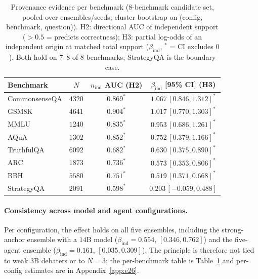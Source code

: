 \begin{table}[t]
\centering\small
\caption{Provenance evidence per benchmark ($8$-benchmark candidate set, pooled over ensembles/seeds; cluster
bootstrap on (config, benchmark, question)). H2: directional AUC of independent support ($>0.5$ = predicts
correctness); H3: partial log-odds of an independent origin at matched total support ($\beta_{\mathrm{ind}}$,
$^{*}$ = CI excludes $0$). Both hold on $7$--$8$ of $8$ benchmarks; StrategyQA is the boundary case.}
\label{tab:h3bench}
\begin{tabular}{lccc}
\toprule
Benchmark & $N$ & $n_{\mathrm{ind}}$ AUC (H2) & $\beta_{\mathrm{ind}}$ [95\% CI] (H3) \\
\midrule
CommonsenseQA & $4320$ & $0.869^{*}$ & $1.067\,[0.846,1.312]^{*}$ \\
GSM8K         & $4641$ & $0.904^{*}$ & $1.017\,[0.770,1.303]^{*}$ \\
MMLU          & $1240$ & $0.835^{*}$ & $0.953\,[0.686,1.261]^{*}$ \\
AQuA          & $1302$ & $0.852^{*}$ & $0.752\,[0.379,1.166]^{*}$ \\
TruthfulQA    & $6092$ & $0.682^{*}$ & $0.630\,[0.375,0.890]^{*}$ \\
ARC           & $1873$ & $0.736^{*}$ & $0.573\,[0.353,0.806]^{*}$ \\
BBH           & $5580$ & $0.751^{*}$ & $0.519\,[0.371,0.668]^{*}$ \\
StrategyQA    & $2091$ & $0.598^{*}$ & $0.203\,[-0.059,0.488]$ \\
\bottomrule
\end{tabular}
\end{table}

\paragraph{Consistency across model and agent configurations.}
\label{par:h3_configs}
Per configuration, the effect holds on all five ensembles, including the strong-anchor ensemble with a
$14$B model ($\beta_{\mathrm{ind}}=0.554$, $[0.346,0.762]$) and the five-agent ensemble
($\beta_{\mathrm{ind}}=0.161$, $[0.035,0.309]$). The principle is therefore not tied to weak $3$B debaters
or to $N=3$; the per-benchmark table is Table~\ref{tab:h3bench} and per-config estimates are in
Appendix~\ref{app:e26}.

